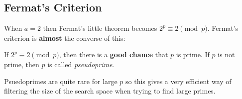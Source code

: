 \documentclass[../main.tex]{subfiles}
\begin{document}
\subsection{Fermat's Criterion}
\label{fermatsCriterion}
\nonexaminable
When $a = 2$ then Fermat's little theorem becomes $2^{p} \equiv 2 \pmod{p}$.
Fermat's criterion is \textbf{almost} the converse of this:
\begin{proposition}
  If $2^{p} \equiv 2 \pmod{p}$, then there is a \textbf{good chance} that $p$ is prime.
  If $p$ is not prime, then $p$ is called \textit{pseudoprime}.
\end{proposition}
Psuedoprimes are quite rare for large $p$ so this gives a very efficient way of filtering the size of the search space when trying to find large primes.
\end{document}
